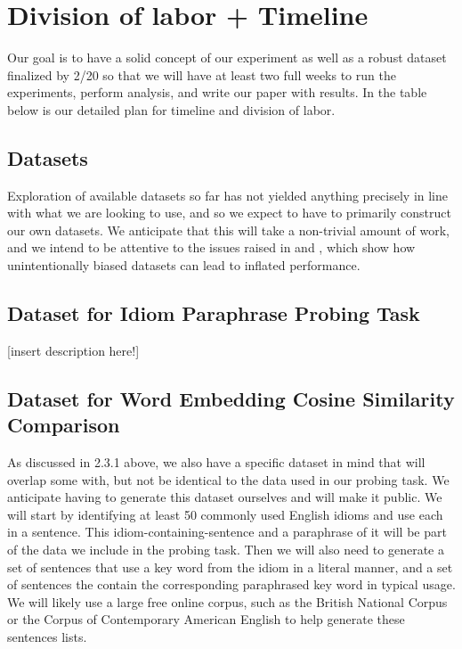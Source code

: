\documentclass[11pt,a4paper]{article}
\begin{document}
\section{Division of labor + Timeline}
Our goal is to have a solid concept of our experiment as well as a robust dataset finalized by 2/20 so that we will have at least two full weeks to run the experiments, perform analysis, and write our paper with results. In the table below is our detailed plan for timeline and division of labor.
\clearpage

\subsection{Datasets}
Exploration of available datasets so far has not yielded anything precisely in line with what we are looking to use, and so we expect to have to primarily construct our own datasets. We anticipate that this will take a non-trivial amount of work, and we intend to be attentive to the issues raised in \citep{niven2019probing} and \citep{mccoy2019right}, which show how unintentionally biased datasets can lead to inflated performance.

\subsection{Dataset for Idiom Paraphrase Probing Task}
\vspace{5mm}
[insert description here!]

\vspace{15mm}


\subsection{Dataset for Word Embedding Cosine Similarity Comparison}
As discussed in 2.3.1 above, we also have a specific dataset in mind that will overlap some with, but not be identical to the data used in our probing task. We anticipate having to generate this dataset ourselves and will make it public. We will start by identifying at least 50 commonly used English idioms and use each in a sentence. This idiom-containing-sentence and a paraphrase of it will be part of the data we include in the probing task. Then we will also need to generate a set of sentences that use a key word from the idiom in a literal manner, and a set of sentences the contain the corresponding paraphrased key word in typical usage. We will likely use a large free online corpus, such as the British National Corpus or the Corpus of Contemporary American English to help generate these sentences lists.
\end{document}
